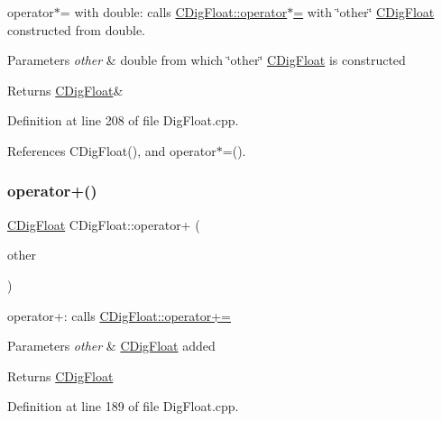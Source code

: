 operator$\ast$= with double\+: calls \hyperlink{classCDigFloat_a9535d47a31a3f1cfa487cc8c567a4a12}{C\+Dig\+Float\+::operator$\ast$=} with \char`\"{}other\char`\"{} \hyperlink{classCDigFloat}{C\+Dig\+Float} constructed from double. 


\begin{DoxyParams}{Parameters}
{\em other} & double from which \char`\"{}other\char`\"{} \hyperlink{classCDigFloat}{C\+Dig\+Float} is constructed \\
\hline
\end{DoxyParams}
\begin{DoxyReturn}{Returns}
\hyperlink{classCDigFloat}{C\+Dig\+Float}\& 
\end{DoxyReturn}


Definition at line 208 of file Dig\+Float.\+cpp.



References C\+Dig\+Float(), and operator$\ast$=().

\mbox{\label{classCDigFloat_a1009b21039c6d32ec4be755251679153}} 
\subsubsection{\texorpdfstring{operator+()}{operator+()}\hspace{0.1cm}{\footnotesize\ttfamily [1/2]}}
{\footnotesize\ttfamily \hyperlink{classCDigFloat}{C\+Dig\+Float} C\+Dig\+Float\+::operator+ (\begin{DoxyParamCaption}\item[{const \hyperlink{classCDigFloat}{C\+Dig\+Float} \&}]{other }\end{DoxyParamCaption})}



operator+\+: calls \hyperlink{classCDigFloat_a84b2ad9b4d1a75aae261074ed7c6fefe}{C\+Dig\+Float\+::operator+=} 


\begin{DoxyParams}{Parameters}
{\em other} & \hyperlink{classCDigFloat}{C\+Dig\+Float} added \\
\hline
\end{DoxyParams}
\begin{DoxyReturn}{Returns}
\hyperlink{classCDigFloat}{C\+Dig\+Float} 
\end{DoxyReturn}


Definition at line 189 of file Dig\+Float.\+cpp.

